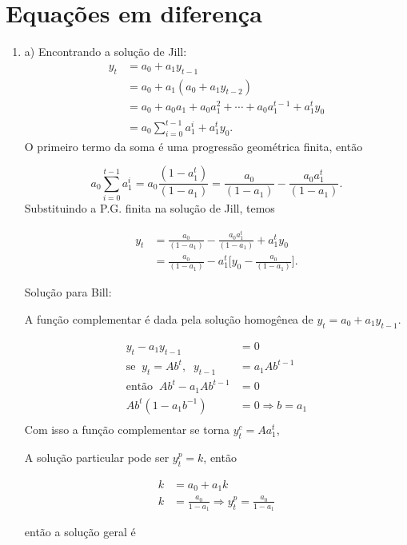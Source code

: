 \chapter{Equações em diferença}

\begin{enumerate}
	\item a) Encontrando a solução de Jill:
	\begin{align*}
		y_t&=a_0+a_1y_{t-1}\\
		&= a_0+a_1(a_0+a_1y_{t-2})\\
		&=a_0+a_0a_1+a_0a_1^2+\cdots+a_0a_1^{t-1}+a_1^ty_0\\
		&= a_0\sum_{i=0}^{t-1}a_1^{i}+a_1^ty_0.
	\end{align*}
	O primeiro termo da soma é uma progressão geométrica finita, então
	
	\begin{equation*}
		a_0\sum_{i=0}^{t-1}a_1^i=a_0\frac{(1-a_1^{t})}{(1-a_1)}=\frac{a_0}{(1-a_1)}-\frac{a_0a_1^{t}}{(1-a_1)}.
	\end{equation*}
	 Substituindo a P.G. finita na solução de Jill, temos
	
	\begin{align*}
		y_t&=\frac{a_0}{(1-a_1)}-\frac{a_0a_1^{t}}{(1-a_1)}+a_1^ty_0\\
		&=\frac{a_0}{(1-a_1)}-a_1^t\bigg[y_0-\frac{a_0}{(1-a_1)}\bigg].
	\end{align*}
	
	Solução para Bill:
		
	A função complementar é dada pela solução homogênea de $y_t=a_0+a_1y_{t-1}$.
	
	\begin{align*}
		y_t-a_1y_{t-1}&=0\\
		\text{se}\;\;y_t=Ab^t,\;\;y_{t-1}&=a_1Ab^{t-1}\\
		\text{então}\;\;Ab^t-a_1Ab^{t-1}&=0\\
		Ab^t({1-a_1b^{-1}})&=0 \Rightarrow b=a_1\\
	\end{align*}
	Com isso a função complementar se torna $y_t^c=Aa_1^t$, 
	
	A solução particular pode ser $y_t^p=k$, então
	
	\begin{align*}
	k&=a_0+a_1k\\
	k&=\frac{a_0}{1-a_1}\Rightarrow y^p_t=\frac{a_0}{1-a_1}
	\end{align*}
	
	então a solução geral é
	

\end{enumerate}
